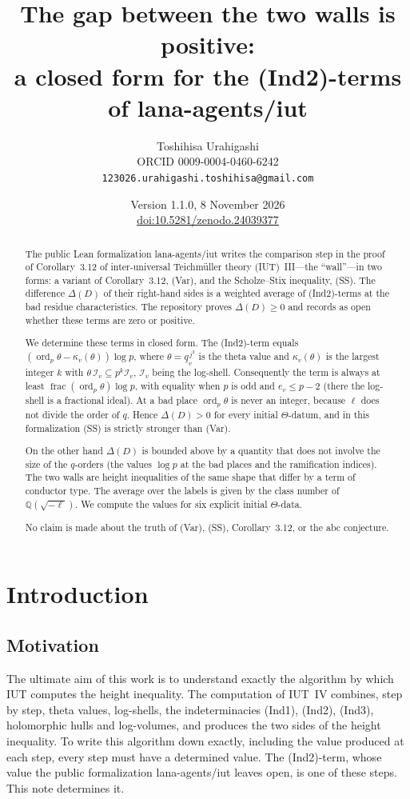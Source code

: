 \documentclass[11pt,a4paper]{article}
\title{The gap between the two walls is positive:\\ a closed form for the (Ind2)-terms of lana-agents/iut}
\author{Toshihisa Urahigashi\\\small ORCID 0009-0004-0460-6242\\\small\texttt{123026.urahigashi.toshihisa@gmail.com}}
\date{Version 1.1.0, 8 November 2026\\\small\href{https://doi.org/10.5281/zenodo.24039377}{doi:10.5281/zenodo.24039377}}
\newcommand{\Q}{\mathbb{Q}}
\newcommand{\I}{\mathcal{I}}
\newcommand{\ordp}{\operatorname{ord}_p}
\newcommand{\fr}{\operatorname{frac}}
\newcommand{\qb}{\underline{q}}
\theoremstyle{plain}
\theoremstyle{definition}
\theoremstyle{remark}
\begin{document}
\maketitle

\begin{abstract}
The public Lean formalization lana-agents/iut writes the comparison step in the proof of Corollary~3.12 of
inter-universal Teichm\"uller theory (IUT)~III---the ``wall''---in two forms: a variant of Corollary~3.12, (Var),
and the Scholze--Stix inequality, (SS). The difference $\Delta(D)$ of their right-hand sides is a weighted average of
(Ind2)-terms at the bad residue characteristics. The repository proves $\Delta(D)\ge0$ and records as open whether
these terms are zero or positive.

We determine these terms in closed form. The (Ind2)-term equals $(\ordp\theta-\kappa_v(\theta))\log p$, where
$\theta=\qb_v^{\,j^2}$ is the theta value and $\kappa_v(\theta)$ is the largest integer $k$ with
$\theta\,\I_v\subseteq p^k\I_v$, $\I_v$ being the log-shell. Consequently the term is always at least
$\fr(\ordp\theta)\log p$, with equality when $p$ is odd and $e_v\le p-2$ (there the log-shell is a fractional
ideal). At a bad place $\ordp\theta$ is never an integer, because $\ell$ does not divide the order of $q$.
Hence $\Delta(D)>0$ for every initial $\Theta$-datum, and in this formalization (SS) is strictly stronger than (Var).

On the other hand $\Delta(D)$ is bounded above by a quantity that does not involve the size of the $q$-orders (the
values $\log p$ at the bad places and the ramification indices). The two walls are height inequalities of the same
shape that differ by a term of conductor type. The average over the labels is given by the class number of
$\Q(\sqrt{-\ell})$. We compute the values for six explicit initial $\Theta$-data.

No claim is made about the truth of (Var), (SS), Corollary~3.12, or the abc conjecture.
\end{abstract}

\tableofcontents

\section{Introduction}

\subsection{Motivation}
The ultimate aim of this work is to understand exactly the algorithm by which IUT computes the height inequality.
The computation of IUT~IV combines, step by step, theta values, log-shells, the indeterminacies (Ind1), (Ind2),
(Ind3), holomorphic hulls and log-volumes, and produces the two sides of the height inequality. To write this
algorithm down exactly, including the value produced at each step, every step must have a determined value. The
(Ind2)-term, whose value the public formalization lana-agents/iut leaves open, is one of these steps. This note
determines it.
\end{document}
